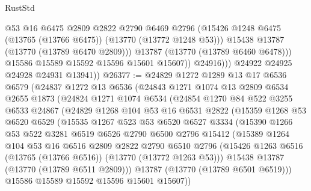 \begin{lexlean}{RustStd}
\begin{coremodule}
                      @53
                      @16
                      @6475
                      @2809
                      @2822
                      @2790
                      @6469
                      @2796
                      (@15426 @1248 @6475 (@13765 (@13766 @6475)) (@13770 (@13772 @1248 @53)))
                      @15438
                      @13787
                      (@13770 (@13789 @6470 @2809)))
                    @13787
                    (@13770 (@13789 @6460 @6478)))
                  @15586
                  @15589
                  @15592
                  @15596
                  @15601
                  @15607))
              @24916)))
        @24922
        @24925
        @24928
        @24931
        @13941))
@26377 := @24829
    @1272
    @1289
    @13
    @17
    @6536
    @6579
    (@24837
      @1272
      @13
      @6536
      (@24843
        @1271
        @1074
        @13
        @2809
        @6534
        @2655
        @1873
        (@24824
          @1271
          @1074
          @6534
          (@24854
            @1270
            @84
            @522
            @3255
            @6533
            @24867
            (@24829
              @1268
              @104
              @53
              @16
              @6531
              @2822
              (@15359
                @1268
                @53
                @6520
                @6529
                (@15535
                  @1267
                  @523
                  @53
                  @6520
                  @6527
                  @3334
                  (@15390
                    @1266
                    @53
                    @522
                    @3281
                    @6519
                    @6526
                    @2790
                    @6500
                    @2796
                    @15412
                    (@15389
                      @1264
                      @104
                      @53
                      @16
                      @6516
                      @2809
                      @2822
                      @2790
                      @6510
                      @2796
                      (@15426 @1263 @6516 (@13765 (@13766 @6516)) (@13770 (@13772 @1263 @53)))
                      @15438
                      @13787
                      (@13770 (@13789 @6511 @2809)))
                    @13787
                    (@13770 (@13789 @6501 @6519)))
                  @15586
                  @15589
                  @15592
                  @15596
                  @15601
                  @15607))

\end{coremodule}
\end{lexlean}
